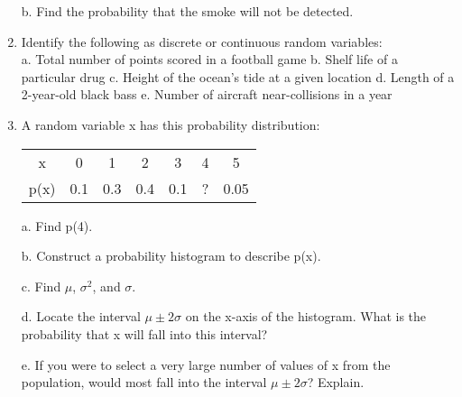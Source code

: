 \documentclass{article}
\begin{document}
\begin{enumerate}
b. Find the probability that the smoke will not be detected.

\item Identify the following as discrete or continuous random variables: \\
a. Total number of points scored in a football game
b. Shelf life of a particular drug
c. Height of the ocean’s tide at a given location
d. Length of a 2-year-old black bass
e. Number of aircraft near-collisions in a year

\item A random variable x has this probability distribution: \\
\begin{center}
    \begin{tabular}{|c|c|c|c|c|c|c|}
        \hline
        x & 0 & 1 & 2 & 3 & 4 & 5\\
        p(x) & 0.1 & 0.3 & 0.4 & 0.1 & ? & 0.05 \\
        \hline
    \end{tabular}
\end{center}

a. Find p(4).

b. Construct a probability histogram to describe p(x).

c. Find $\mu$, $\sigma^2$, and $\sigma$.

d. Locate the interval $\mu \pm 2\sigma$ on the x-axis of the histogram. What is the probability that x will fall into this interval?

e. If you were to select a very large number of values of x from the population, would most fall into the interval $\mu \pm 2\sigma$? Explain.




\end{enumerate}
\end{document}
